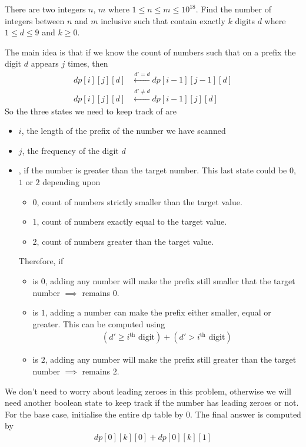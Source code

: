 \documentclass[11pt]{scrartcl}
\begin{document}
\begin{problem}
    There are two integers $n$, $m$ where $1 \le n \le m \le 10^{18}$. Find the number of integers between $n$ and $m$ inclusive such that contain exactly $k$ digits $d$ where $1 \le d \le 9$ and $k \geq 0$.
\end{problem}
The main idea is that if we know the count of numbers such that on a prefix the digit $d$ appears $j$ times, then 
\begin{align*}
    dp[i][j][d] &\stackrel{d' = d}{\longleftarrow} dp[i - 1][j - 1][d] \\ 
    dp[i][j][d] &\stackrel{d' \neq d}{\longleftarrow} dp[i - 1][j][d]
\end{align*}
So the three states we need to keep track of are
\begin{itemize}
    \item $i$, the length of the prefix of the number we have scanned
    \item $j$, the frequency of the digit $d$
    \item {}, if the number is greater than the target number. This last state could be $0$, $1$ or $2$ depending upon
    \begin{itemize}
        \item $0$, count of numbers strictly smaller than the target value.
        \item $1$, count of numbers exactly equal to the target value.
        \item $2$, count of numbers greater than the target value.
    \end{itemize}
    Therefore, if
    \begin{itemize}
        \item {} is $0$, adding any number will make the prefix still smaller that the target number $\implies$  remains $0$.
        \item {} is $1$, adding a number can make the prefix either smaller, equal or greater. This can be computed using
        \begin{align*}
            (d' \geq i^{\text{th}}\text{ digit}) + (d' > i^{\text{th}}\text{ digit})
        \end{align*}
        \item {} is $2$, adding any number will make the prefix still greater than the target number $\implies$  remains $2$.
    \end{itemize}
\end{itemize}
We don't need to worry about leading zeroes in this problem, otherwise we will need another boolean state to keep track if the number has leading zeroes or not. For the base case, initialise the entire dp table by $0$. The final answer is computed by 
\begin{align*}
    \boxed{dp[0][k][0] + dp[0][k][1]}
\end{align*}
\end{document}
